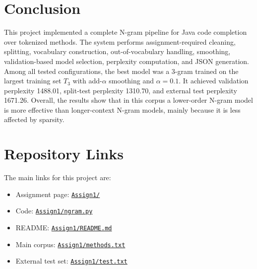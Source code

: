 \documentclass[11pt]{article}
\newcommand{\repoURL}{https://github.com/ABasloe/CSCI555}
\begin{document}
\section{Conclusion}
This project implemented a complete N-gram pipeline for Java code completion over tokenized methods. The system performs assignment-required cleaning, splitting, vocabulary construction, out-of-vocabulary handling, smoothing, validation-based model selection, perplexity computation, and JSON generation. Among all tested configurations, the best model was a 3-gram trained on the largest training set \(T_3\) with add-\(\alpha\) smoothing and \(\alpha = 0.1\). It achieved validation perplexity 1488.01, split-test perplexity 1310.70, and external test perplexity 1671.26. Overall, the results show that in this corpus a lower-order N-gram model is more effective than longer-context N-gram models, mainly because it is less affected by sparsity.

\section*{Repository Links}
The main links for this project are:
\begin{itemize}[leftmargin=*]
  \item Assignment page: \href{\repoURL/tree/main/Assign1}{\texttt{Assign1/}}
  \item Code: \href{\repoURL/blob/main/Assign1/ngram.py}{\texttt{Assign1/ngram.py}}
  \item README: \href{\repoURL/blob/main/Assign1/README.md}{\texttt{Assign1/README.md}}
  \item Main corpus: \href{\repoURL/blob/main/Assign1/methods.txt}{\texttt{Assign1/methods.txt}}
  \item External test set: \href{\repoURL/blob/main/Assign1/test.txt}{\texttt{Assign1/test.txt}}
\end{itemize}
\end{document}
